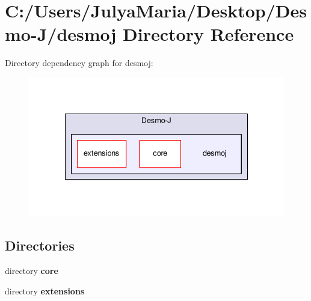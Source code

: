 \section{C\-:/\-Users/\-Julya\-Maria/\-Desktop/\-Desmo-\/\-J/desmoj Directory Reference}
\label{dir_22993bf1bb0c3e258bb2cbcc57efb7cc}
Directory dependency graph for desmoj\-:
\nopagebreak
\begin{figure}[H]
\begin{center}
\leavevmode
\includegraphics[width=336pt]{dir_22993bf1bb0c3e258bb2cbcc57efb7cc_dep}
\end{center}
\end{figure}
\subsection*{Directories}
\begin{DoxyCompactItemize}
\item 
directory {\bf core}
\item 
directory {\bf extensions}
\end{DoxyCompactItemize}
